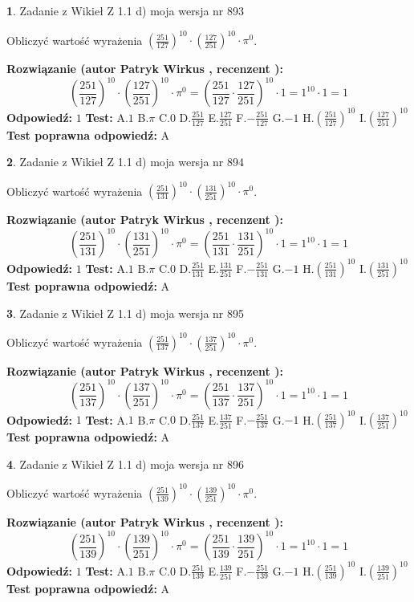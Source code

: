 \documentclass[12pt, a4paper]{article}
\theoremstyle{definition} %
\newtheorem{zad}{}
\newcommand{\zadStart}[1]{\begin{zad}#1\newline}
\newcommand{\zadStop}{\end{zad}}
\newcommand{\rozwStart}[2]{\noindent \textbf{Rozwiązanie (autor #1 , recenzent #2): }\newline}
\newcommand{\rozwStop}{\newline}
\newcommand{\odpStart}{\noindent \textbf{Odpowiedź:}\newline}
\newcommand{\odpStop}{\newline}
\newcommand{\testStart}{\noindent \textbf{Test:}\newline}
\newcommand{\testStop}{\newline}
\newcommand{\kluczStart}{\noindent \textbf{Test poprawna odpowiedź:}\newline}
\newcommand{\kluczStop}{\newline}
\begin{document}
\zadStart{Zadanie z Wikieł Z 1.1 d) moja wersja nr 893}

Obliczyć wartość wyrażenia $(\frac{251}{127})^{10} \cdot (\frac{127}{251})^{10} \cdot \pi^{0}$.
\zadStop
\rozwStart{Patryk Wirkus}{}
$$(\frac{251}{127})^{10} \cdot (\frac{127}{251})^{10} \cdot \pi^{0} = (\frac{251}{127} \cdot \frac{127}{251})^{10} \cdot 1 = 1^{10} \cdot 1 = 1$$
\rozwStop
\odpStart
$1$
\odpStop
\testStart
A.$1$ B.$\pi$ C.$0$ D.$\frac{251}{127}$ E.$\frac{127}{251}$
F.$-\frac{251}{127}$ G.$-1$
H.$(\frac{251}{127})^{10}$
I.$(\frac{127}{251})^{10}$
\testStop
\kluczStart
A
\kluczStop



\zadStart{Zadanie z Wikieł Z 1.1 d) moja wersja nr 894}

Obliczyć wartość wyrażenia $(\frac{251}{131})^{10} \cdot (\frac{131}{251})^{10} \cdot \pi^{0}$.
\zadStop
\rozwStart{Patryk Wirkus}{}
$$(\frac{251}{131})^{10} \cdot (\frac{131}{251})^{10} \cdot \pi^{0} = (\frac{251}{131} \cdot \frac{131}{251})^{10} \cdot 1 = 1^{10} \cdot 1 = 1$$
\rozwStop
\odpStart
$1$
\odpStop
\testStart
A.$1$ B.$\pi$ C.$0$ D.$\frac{251}{131}$ E.$\frac{131}{251}$
F.$-\frac{251}{131}$ G.$-1$
H.$(\frac{251}{131})^{10}$
I.$(\frac{131}{251})^{10}$
\testStop
\kluczStart
A
\kluczStop



\zadStart{Zadanie z Wikieł Z 1.1 d) moja wersja nr 895}

Obliczyć wartość wyrażenia $(\frac{251}{137})^{10} \cdot (\frac{137}{251})^{10} \cdot \pi^{0}$.
\zadStop
\rozwStart{Patryk Wirkus}{}
$$(\frac{251}{137})^{10} \cdot (\frac{137}{251})^{10} \cdot \pi^{0} = (\frac{251}{137} \cdot \frac{137}{251})^{10} \cdot 1 = 1^{10} \cdot 1 = 1$$
\rozwStop
\odpStart
$1$
\odpStop
\testStart
A.$1$ B.$\pi$ C.$0$ D.$\frac{251}{137}$ E.$\frac{137}{251}$
F.$-\frac{251}{137}$ G.$-1$
H.$(\frac{251}{137})^{10}$
I.$(\frac{137}{251})^{10}$
\testStop
\kluczStart
A
\kluczStop



\zadStart{Zadanie z Wikieł Z 1.1 d) moja wersja nr 896}

Obliczyć wartość wyrażenia $(\frac{251}{139})^{10} \cdot (\frac{139}{251})^{10} \cdot \pi^{0}$.
\zadStop
\rozwStart{Patryk Wirkus}{}
$$(\frac{251}{139})^{10} \cdot (\frac{139}{251})^{10} \cdot \pi^{0} = (\frac{251}{139} \cdot \frac{139}{251})^{10} \cdot 1 = 1^{10} \cdot 1 = 1$$
\rozwStop
\odpStart
$1$
\odpStop
\testStart
A.$1$ B.$\pi$ C.$0$ D.$\frac{251}{139}$ E.$\frac{139}{251}$
F.$-\frac{251}{139}$ G.$-1$
H.$(\frac{251}{139})^{10}$
I.$(\frac{139}{251})^{10}$
\testStop
\kluczStart
A
\kluczStop
\end{document}
